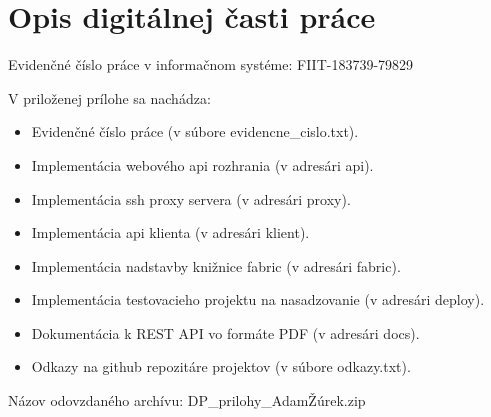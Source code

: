 \renewcommand\chaptername{Príloha}

\chapter{Opis digitálnej časti práce}

\renewcommand*{\thepage}{B\arabic{page}}
\setcounter{page}{1}

Evidenčné číslo práce v informačnom systéme: FIIT-183739-79829

V priloženej prílohe sa nachádza:

\begin{itemize}
    \item Evidenčné číslo práce (v súbore evidencne\_cislo.txt).
    \item Implementácia webového api rozhrania (v adresári api).
    \item Implementácia ssh proxy servera (v adresári proxy).
    \item Implementácia api klienta (v adresári klient).
    \item Implementácia nadstavby knižnice fabric (v adresári fabric).
    \item Implementácia testovacieho projektu na nasadzovanie (v adresári deploy).
    \item Dokumentácia k REST API vo formáte PDF (v adresári docs).
    \item Odkazy na github repozitáre projektov (v súbore odkazy.txt).
\end{itemize}

Názov odovzdaného archívu: DP\_prilohy\_AdamŽúrek.zip
